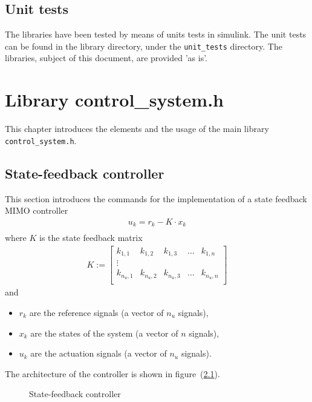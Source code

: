 \documentclass[12pt]{Template_}
\begin{document}
\section{Unit tests}
The libraries have been tested by means of units tests in simulink. The unit tests can be found in the library directory, under the \verb~unit_tests~ directory. The libraries, subject of this document, are provided 'as is'.

\chapter{Library control\_system.h}
This chapter introduces the elements and the usage of the main library \verb~control_system.h~.

\section{State-feedback controller}
This section introduces the commands for the implementation of a state feedback MIMO controller
\begin{eqnarray*}
 u_k = r_k - K\cdot x_k \\
\end{eqnarray*}
where $K$ is the state feedback matrix
\[
\begin{array}{cccc}
 K:=\left[ \begin{array}{ccccc}
 k_{1,1} & k_{1,2} & k_{1,3} & \ldots & k_{1,n}\\
 \vdots\\
 k_{n_u,1} & k_{n_u,2} & k_{n_u,3} & \ldots &k_{n_u,n}\\
 \end{array}
 \right]
 \end{array}
\]
and 
\begin{itemize}
\item $r_k$ are the reference signals (a vector of $n_u$ signals),
\item $x_k$ are the states of the system (a vector of $n$ signals),
\item $u_k$ are the actuation signals (a vector of $n_u$ signals).
\end{itemize}
The architecture of the controller is shown in figure~(\ref{fig:sfb_ctr}).
\begin{figure}[htb]
\begin{center}

\vspace{-3mm}
\caption{State-feedback controller}
\label{fig:sfb_ctr}
\end{center}
\end{figure}
\end{document}
